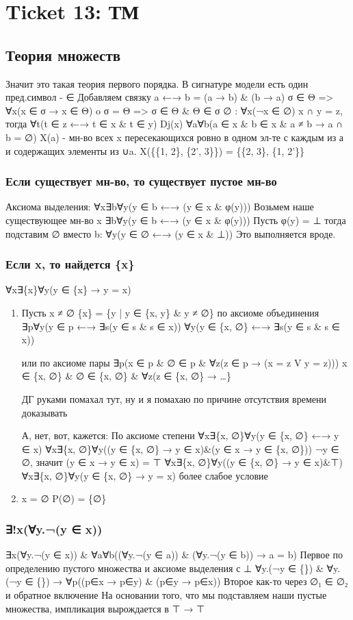\documentclass[11pt]{article}
\begin{document}
\section{Ticket 13: ТМ}
\label{sec-15}
\subsection{Теория множеств}
\label{sec-15-1}
   Значит это такая теория первого порядка.
   В сигнатуре модели есть один пред.символ - ∈
   Добавляем связку a ←→ b = (a → b) \& (b → a)
   σ ∈ Θ => ∀x(x ∈ σ → x ∈ Θ)
o   σ = Θ => σ ∈ Θ \& Θ ∈ σ
   ∅ : ∀x(¬x ∈ ∅)
   x ∩ y = z, тогда ∀t(t ∈ z ←→ t ∈ x \& t ∈ y)
   Dj(x) ∀a∀b(a ∈ x \& b ∈ x \& a ≠ b → a ∩ b = ∅)
   X(a) - мн-во всех x пересекающихся ровно в одном эл-те с каждым из а
   и содержащих элементы из ∪a.
   X(\{\{1, 2\}, \{2', 3\}\}) = \{\{2, 3\}, \{1, 2'\}\}
\subsubsection{Если существует мн-во, то существует пустое мн-во}
\label{sec-15-1-1}
Аксиома выделения:
∀x∃b∀y(y ∈ b ←→ (y ∈ x \& φ(y)))
Возьмем наше существующее мн-во x
∃b∀y(y ∈ b ←→ (y ∈ x \& φ(y)))
Пусть φ(y) = ⊥
тогда подставим ∅ вместо b:
∀y(y ∈ ∅ ←→ (y ∈ x \& ⊥))
Это выполняется вроде.
\subsubsection{Если x, то найдется \{x\}}
\label{sec-15-1-2}
∀x∃\{x\}∀y(y ∈ \{x\} → y = x)
\begin{enumerate}
\item Пусть x ≠ ∅
\{x\} = \{y | y ∈ \{x, y\} \& y ≠ ∅\}
по аксиоме объединения ∃p∀y(y ∈ p ←→ ∃s(y ∈ s \& s ∈ x))
∀y(y ∈ \{x, ∅\} ←→ ∃s(y ∈ s \& s ∈ x))

или по аксиоме пары
∃p(x ∈ p \& ∅ ∈ p \& ∀z(z ∈ p → (x = z V y = z)))
x ∈ \{x, ∅\} \& ∅ ∈ \{x, ∅\} \& ∀z(z ∈ \{x, ∅\} → \ldots{}\}

ДГ руками помахал тут, ну и я помахаю по причине
отсутствия времени доказывать

А, нет, вот, кажется:
По аксиоме степени ∀x∃\{x, ∅\}∀y(y ∈ \{x, ∅\} ←→ y ∈ x)
∀x∃\{x, ∅\}∀y((y ∈ \{x, ∅\} → y ∈ x)\&(y ∈ x → y ∈ \{x, ∅\}))
¬y ∈ ∅, значит (y ∈ x → y ∈ x) = ⊤
∀x∃\{x, ∅\}∀y((y ∈ \{x, ∅\} → y ∈ x)\&⊤)
∀x∃\{x, ∅\}∀y(y ∈ \{x, ∅\} → y = x)   более слабое условие
\item x = ∅
P(∅) = \{∅\}
\end{enumerate}
\subsubsection{∃!x(∀y.¬(y ∈ x))}
\label{sec-15-1-3}
∃x(∀y.¬(y ∈ x)) \& ∀a∀b((∀y.¬(y ∈ a)) \& (∀y.¬(y ∈ b)) → a = b)
Первое по определению пустого множества и аксиоме выделения с ⊥
∀y.(¬y ∈ \{\}) \& ∀y.(¬y ∈ \{\}) → ∀p((p∈x → p∈y) \& (p∈y → p∈x))
Второе как-то через ∅₁ ∈ ∅₂ и обратное включение
На основании того, что мы подставляем наши пустые множества, импликация
вырождается в ⊤ → ⊤
\end{document}
